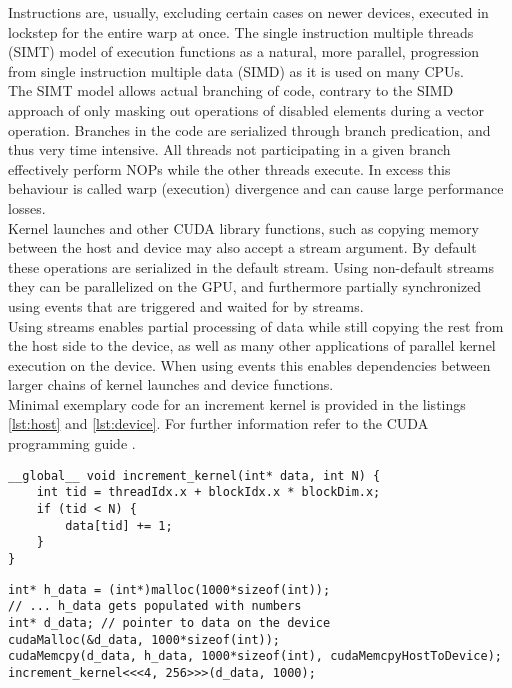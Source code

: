\documentclass{tudscrreprt}
\newcommand{\markr}[1]{\textcolor{review}{$\langle$#1$\rangle$}}
\begin{document}
				Instructions are, usually, excluding certain cases on newer devices, executed in lockstep for the entire warp at once. The single instruction multiple threads (SIMT) model of execution functions as a natural, more parallel, progression from single instruction multiple data (SIMD) as it is used on many CPUs. \cite{simd_simt_smd} \\
				The SIMT model allows actual branching of code, contrary to the SIMD approach of only masking out operations of disabled elements during a vector operation. Branches in the code are serialized through branch predication, and thus very time intensive. All threads not participating in a given branch effectively perform NOPs while the other threads execute. In excess this behaviour is called warp (execution) divergence and can cause large performance losses. \\
				
				Kernel launches and other CUDA library functions, such as copying memory between the host and device may also accept a stream argument. By default these operations are serialized in the default stream. Using non-default streams they can be parallelized on the GPU, and furthermore partially synchronized using events that are triggered and waited for by streams. \\
				Using streams enables partial processing of data while still copying the rest from the host side to the device, as well as many other applications of parallel kernel execution on the device. When using events this enables dependencies between larger chains of kernel launches and device functions. \cite{cuda_streams_devblog, cuda_streams_events} \\
				
				Minimal exemplary code for an increment kernel is provided in the listings \ref{lst:host} and \ref{lst:device}. For further information refer to the CUDA programming guide \cite{cuda_programmingguide}. \\
				\newpage %
				\begin{lstlisting}[label=lst:host,caption=Device Side: Increment Kernel]
__global__ void increment_kernel(int* data, int N) {
	int tid = threadIdx.x + blockIdx.x * blockDim.x;
	if (tid < N) {
		data[tid] += 1;
	}
}
				\end{lstlisting}
				
				\begin{lstlisting}[label=lst:device,caption=Host Side: Device Malloc and Kernel Launch]
int* h_data = (int*)malloc(1000*sizeof(int));
// ... h_data gets populated with numbers
int* d_data; // pointer to data on the device
cudaMalloc(&d_data, 1000*sizeof(int));
cudaMemcpy(d_data, h_data, 1000*sizeof(int), cudaMemcpyHostToDevice);
increment_kernel<<<4, 256>>>(d_data, 1000);
				\end{lstlisting}
				
\end{document}
